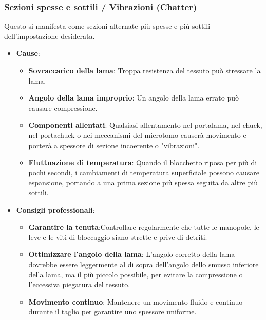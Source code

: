 \subsubsection{Sezioni spesse e sottili / Vibrazioni (Chatter)}
Questo si manifesta come sezioni alternate più spesse e più sottili dell'impostazione desiderata. 
\begin{itemize}
    \item   \textbf{Cause}:
    \begin{itemize}
        \item   \textbf{Sovraccarico della lama}: Troppa resistenza del tessuto può stressare la lama. 
        \item   \textbf{Angolo della lama improprio}: Un angolo della lama errato può causare compressione. 
        \item   \textbf{Componenti allentati}: Qualsiasi allentamento nel portalama, nel chuck, nel portachuck o nei meccanismi del microtomo causerà movimento e porterà a spessore di sezione incoerente o "vibrazioni". 
        \item   \textbf{Fluttuazione di temperatura}: Quando il blocchetto riposa per più di pochi secondi, i cambiamenti di temperatura superficiale possono causare espansione, portando a una prima sezione più spessa seguita da altre più sottili. 
    \end{itemize}
    \item   \textbf{Consigli professionali}:
    \begin{itemize}
        \item   \textbf{Garantire la tenuta}:Controllare regolarmente che tutte le manopole, le leve e le viti di bloccaggio siano strette e prive di detriti. 
        \item   \textbf{Ottimizzare l'angolo della lama}: L'angolo corretto della lama dovrebbe essere leggermente al di sopra dell'angolo dello smusso inferiore della lama, ma il più piccolo possibile, per evitare la compressione o l'eccessiva piegatura del tessuto. 
        \item   \textbf{Movimento continuo}: Mantenere un movimento fluido e continuo durante il taglio per garantire uno spessore uniforme. 
    \end{itemize}
\end{itemize}


